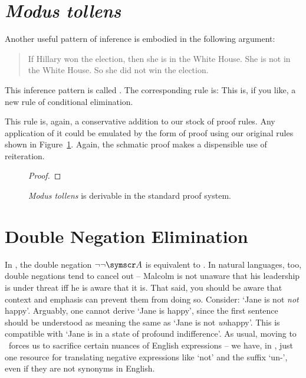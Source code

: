\section{\emph{Modus tollens}}
Another useful pattern of inference is embodied in the following argument:
	\begin{quote}
		If Hillary won the election, then she is in the White House. She is not in the White House. So she did not win the election.
	\end{quote}
This inference pattern is called . The corresponding rule is:
This is, if you like, a new rule of conditional elimination.

This rule is, again, a conservative addition to our stock of proof rules. Any application of it could be emulated by the form of proof using our original rules shown in Figure~\ref{fig.mtder}. Again, the schmatic proof makes a dispensible use of reiteration.
\begin{figure}
	\begin{proof}
	\have[\ ]{}{\vdots}
		\open
		\close
\end{proof}
\caption{\emph{Modus tollens} is derivable in the standard proof system.\label{fig.mtder}}
\end{figure}



\section{Double Negation Elimination}

In \TFL, the double negation $\enot\enot\meta{A}$ is equivalent to . In natural languages, too, double negations tend to cancel out – Malcolm is not unaware that his leadership is under threat iff he is aware that it is. That said, you should be aware that context and emphasis can prevent them from doing so. Consider: `Jane is not \emph{not} happy'. Arguably, one cannot derive `Jane is happy', since the first sentence should be understood as meaning the same as  `Jane is not \emph{un}happy'. This is compatible with `Jane is in a state of profound indifference'. As usual, moving to \TFL\ forces us to sacrifice certain nuances of English expressions – we have, in \TFL, just one resource for translating negative expressions like `not' and the suffix `un-', even if they are not synonyms in English.

